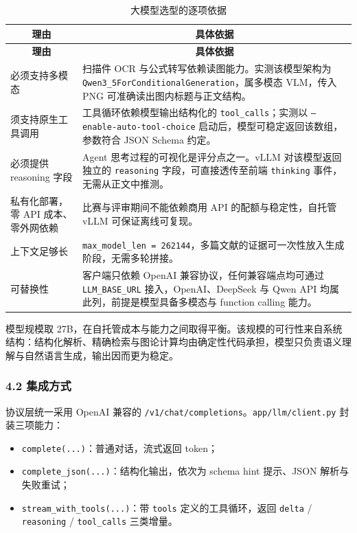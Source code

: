 \documentclass[UTF8,fontset=windows,zihao=5,a4paper]{ctexart}
\begin{document}
\begin{longtable}{@{}p{}p{}@{}}
\caption{大模型选型的逐项依据}\\
\toprule
\multicolumn{1}{c}{\textbf{理由}} & \multicolumn{1}{c}{\textbf{具体依据}} \\
\midrule
\endfirsthead
\toprule
\multicolumn{1}{c}{\textbf{理由}} & \multicolumn{1}{c}{\textbf{具体依据}} \\
\midrule
\endhead
\bottomrule
\endfoot
必须支持多模态 & 扫描件 OCR 与公式转写依赖读图能力。实测该模型架构为 \texttt{Qwen3\_\allowbreak{}5ForConditionalGeneration}，属多模态 VLM，传入 PNG 可准确读出图内标题与正文结构。 \\
须支持原生工具调用 & 工具循环依赖模型输出结构化的 \texttt{tool\_\allowbreak{}calls}；实测以 \texttt{--enable-auto-tool-choice} 启动后，模型可稳定返回该数组，参数符合 JSON Schema 约定。 \\
必须提供 reasoning 字段 & Agent 思考过程的可视化是评分点之一。vLLM 对该模型返回独立的 \texttt{reasoning} 字段，可直接透传至前端 \texttt{thinking} 事件，无需从正文中推测。 \\
私有化部署，零 API 成本、零外网依赖 & 比赛与评审期间不能依赖商用 API 的配额与稳定性，自托管 vLLM 可保证离线可复现。 \\
上下文足够长 & \texttt{max\_\allowbreak{}model\_\allowbreak{}len = 262144}，多篇文献的证据可一次性放入生成阶段，无需多轮拼接。 \\
可替换性 & 客户端只依赖 OpenAI 兼容协议，任何兼容端点均可通过 \texttt{LLM\_\allowbreak{}BASE\_\allowbreak{}URL} 接入，OpenAI、DeepSeek 与 Qwen API 均属此列，前提是模型具备多模态与 function calling 能力。 \\
\end{longtable}

模型规模取 27B，在自托管成本与能力之间取得平衡。该规模的可行性来自系统结构：结构化解析、精确检索与图论计算均由确定性代码承担，模型只负责语义理解与自然语言生成，输出因而更为稳定。

\subsubsection*{4.2 集成方式}
协议层统一采用 OpenAI 兼容的 \texttt{/v1/chat/completions}。\texttt{app/llm/client.py} 封装三项能力：

\begin{itemize}
\item \texttt{complete(...)}：普通对话，流式返回 token；
\item \texttt{complete\_\allowbreak{}json(...)}：结构化输出，依次为 schema hint 提示、JSON 解析与失败重试；
\item \texttt{stream\_\allowbreak{}with\_\allowbreak{}tools(...)}：带 \texttt{tools} 定义的工具循环，返回 \texttt{delta} / \texttt{reasoning} / \texttt{tool\_\allowbreak{}calls} 三类增量。
\end{itemize}
\end{document}
